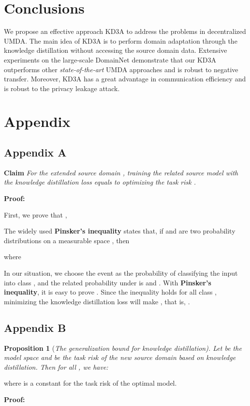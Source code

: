 \documentclass{article}
\begin{document}
 \section{Conclusions}
We propose an effective approach KD3A to address the problems in decentralized UMDA. The main idea of KD3A is to perform domain adaptation through the knowledge distillation without accessing the source domain data. Extensive experiments on the large-scale DomainNet demonstrate that our KD3A outperforms other \textit{state-of-the-art} UMDA approaches and is robust to negative transfer. Moreover, KD3A has a great advantage in communication efficiency and is robust to the privacy leakage attack. 




\newpage
\setcounter{equation}{0}
\section{Appendix}
\subsection{Appendix A}
\textbf{Claim} \textit{For the extended source domain , training the related source model  with the knowledge distillation loss  equals to optimizing the task risk .}

\textbf{Proof:}

First, we prove that ,

The widely used \textbf{Pinsker's inequality} states that, if  and  are two probability distributions on a measurable space , then 

where 

In our situation, we choose the event  as the probability of classifying the input  into class , and the related probability under  is  and . With \textbf{Pinsker's inequality}, it is easy to prove .  Since the inequality  holds for all class , minimizing the knowledge distillation loss will make , that is, .
\subsection{Appendix B}
\textbf{Proposition 1} (\textit{The generalization bound for knowledge distillation). Let  be the model space and  be the task risk of the new source domain  based on knowledge distillation. Then for all , we have:}

where  is a constant for the task risk of the optimal model.

\textbf{Proof:}
\end{document}
